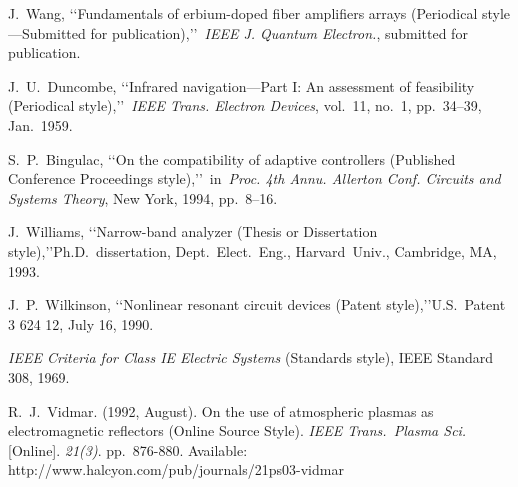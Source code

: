 \documentclass[conference,a4paper,twocolumn]{IEEEtran}
\begin{document}
\begin{thebibliography}{99}
 J.~Wang, \lq\lq Fundamentals of erbium-doped fiber amplifiers arrays (Periodical style---Submitted for publication),\rq\rq~\emph{IEEE J. Quantum Electron.}, submitted for publication.

 J.~U.~Duncombe, \lq\lq Infrared navigation---Part I: An assessment of feasibility (Periodical style),\rq\rq~\emph{IEEE Trans. Electron Devices}, vol.~11, no.~1, pp.~34--39, Jan.~1959.

 S.~P.~Bingulac, \lq\lq On the compatibility of adaptive controllers (Published Conference Proceedings style),\rq\rq~in~\emph{Proc. 4th Annu. Allerton Conf. Circuits and Systems Theory}, New York, 1994, pp.~8--16.

 J.~Williams, \lq\lq Narrow-band analyzer (Thesis or Dissertation style),\rq\rq Ph.D.~dissertation, Dept.~Elect.~Eng., Harvard~Univ., Cambridge, MA, 1993. 

 J.~P.~Wilkinson, \lq\lq Nonlinear resonant circuit devices (Patent style),\rq\rq U.S.~Patent 3 624 12, July 16, 1990. 

 \emph{IEEE Criteria for Class IE Electric Systems} (Standards style), IEEE Standard 308, 1969.

 R.~J.~Vidmar. (1992, August). On the use of atmospheric plasmas as electromagnetic reflectors (Online Source Style). \emph{IEEE Trans.~Plasma Sci.} [Online]. \emph{21(3)}. pp.~876-880. Available: http://www.halcyon.com/pub/journals/21ps03-vidmar

\end{thebibliography}


\end{document}
